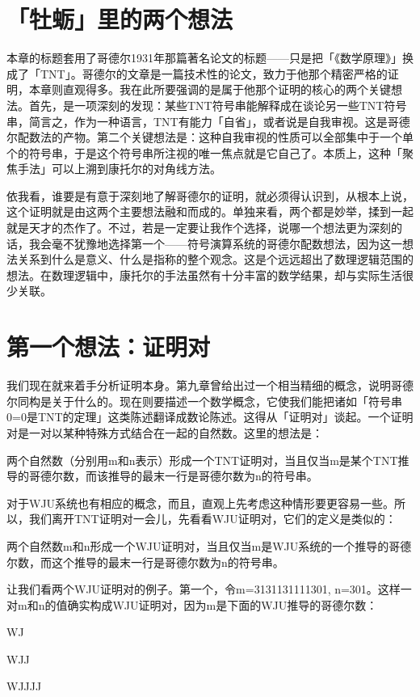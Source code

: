 \documentclass[
  12pt,
  twoside,
  openright,
  oldfontcommands,
]{memoir}
\begin{document}
\section{「牡蛎」里的两个想法}

本章的标题套用了哥德尔1931年那篇著名论文的标题------只是把「《数学原理》」换成了「TNT」。哥德尔的文章是一篇技术性的论文，致力于他那个精密严格的证明，本章则直观得多。我在此所要强调的是属于他那个证明的核心的两个关键想法。首先，是一项深刻的发现：某些TNT符号串能解释成在谈论另一些TNT符号串，简言之，作为一种语言，TNT有能力「自省」，或者说是自我审视。这是哥德尔配数法的产物。第二个关键想法是：这种自我审视的性质可以全部集中于一个单个的符号串，于是这个符号串所注视的唯一焦点就是它自己了。本质上，这种「聚焦手法」可以上溯到康托尔的对角线方法。

依我看，谁要是有意于深刻地了解哥德尔的证明，就必须得认识到，从根本上说，这个证明就是由这两个主要想法融和而成的。单独来看，两个都是妙举，揉到一起就是天才的杰作了。不过，若是一定要让我作个选择，说哪一个想法更为深刻的话，我会毫不犹豫地选择第一个------符号演算系统的哥德尔配数想法，因为这一想法关系到什么是意义、什么是指称的整个观念。这是个远远超出了数理逻辑范围的想法。在数理逻辑中，康托尔的手法虽然有十分丰富的数学结果，却与实际生活很少关联。

\section{第一个想法：证明对}

我们现在就来着手分析证明本身。第九章曾给出过一个相当精细的概念，说明哥德尔同构是关于什么的。现在则要描述一个数学概念，它使我们能把诸如「符号串0=0是TNT的定理」这类陈述翻译成数论陈述。这得从「证明对」谈起。一个证明对是一对以某种特殊方式结合在一起的自然数。这里的想法是：

{两个自然数（分别用m和n表示）形成一个TNT证明对，当且仅当m是某个TNT推导的哥德尔数，而该推导的最末一行是哥德尔数为n的符号串。}

对于WJU系统也有相应的概念，而且，直观上先考虑这种情形要更容易一些。所以，我们离开TNT证明对一会儿，先看看WJU证明对，它们的定义是类似的：

{两个自然数m和n形成一个WJU证明对，当且仅当m是WJU系统的一个推导的哥德尔数，而这个推导的最末一行是哥德尔数为n的符号串。}

让我们看两个WJU证明对的例子。第一个，令m=3131131111301,
n=301。这样一对m和n的值确实构成WJU证明对，因为m是下面的WJU推导的哥德尔数：

WJ

WJJ

WJJJJ
\end{document}
